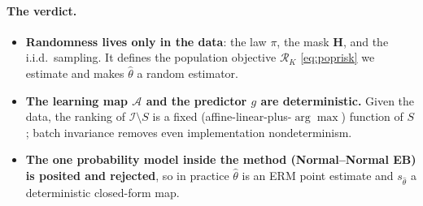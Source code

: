 \documentclass[11pt]{article}
\theoremstyle{remark}
\newcommand{\I}{\mathcal{I}}
\newcommand{\RK}{\mathcal{R}_K}
\begin{document}
\paragraph{The verdict.}
\begin{itemize}
  \item \textbf{Randomness lives only in the data}: the law $\pi$, the mask $\mathbf H$, and the i.i.d.\ sampling.
  It defines the population objective $\RK$ \eqref{eq:poprisk} we estimate and makes $\hat\theta$ a random
  estimator.
  \item \textbf{The learning map $\mathcal A$ and the predictor $g$ are deterministic.} Given the data, the ranking
  of $\I\setminus S$ is a fixed (affine-linear-plus-$\arg\max$) function of $S$; batch invariance removes even
  implementation nondeterminism.
  \item \textbf{The one probability model inside the method (Normal--Normal EB) is posited and rejected}, so in
  practice $\hat\theta$ is an ERM point estimate and $s_{\hat\theta}$ a deterministic closed-form map.
\end{itemize}

\begin{center}
\end{center}
\end{document}
